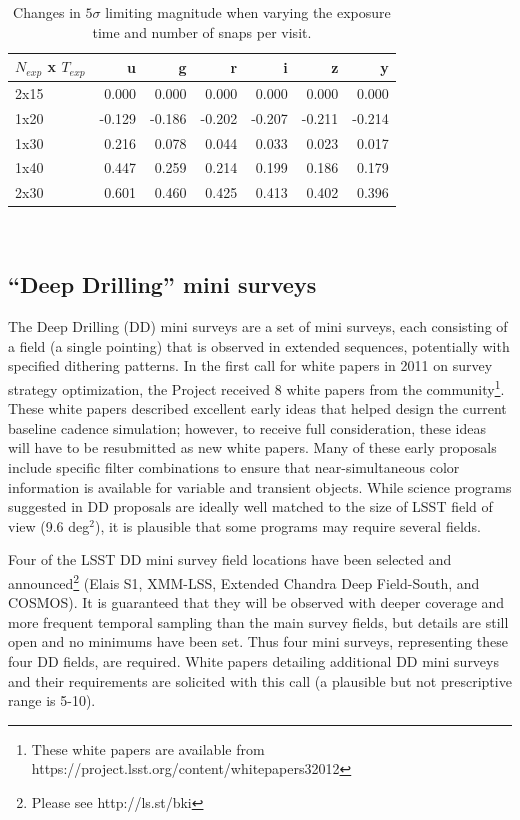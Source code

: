 \documentclass[DM,toc,usenatbib]{lsstdoc}
\begin{document}
\begin{table}[htbp]
\centering
\caption{Changes in $5\sigma$ limiting magnitude when varying the exposure time and number of snaps per visit.}
\begin{tabular}{lrrrrrr}
\hline
{$N_{exp}$ x $T_{exp}$} &      u &      g &      r &      i &      z &      y \\
\hline
2x15 &  0.000 &  0.000 &  0.000 &  0.000 &  0.000 &  0.000 \\
1x20 & -0.129 & -0.186 & -0.202 & -0.207 & -0.211 & -0.214 \\
1x30 &  0.216 &  0.078 &  0.044 &  0.033 &  0.023 &  0.017 \\
1x40 &  0.447 &  0.259 &  0.214 &  0.199 &  0.186 &  0.179 \\
2x30 &  0.601 &  0.460 &  0.425 &  0.413 &  0.402 &  0.396 \\
\hline
\end{tabular}\\ \vskip 0.05in
\label{m5.tab}
\end{table}


\subsection{``Deep Drilling'' mini surveys} 

The Deep Drilling (DD) mini surveys are a set of mini surveys, each consisting of a field (a single pointing) 
that is observed in extended sequences, potentially with specified dithering patterns.
In the first call for white papers in 2011 on survey strategy optimization, the Project received 
8 white papers from the community\footnote{These white papers are available from 
https://project.lsst.org/content/whitepapers32012}. 
These white papers described excellent early ideas that helped design the current baseline 
cadence simulation; however, to receive full consideration, these ideas will have to be 
resubmitted as new white papers. Many of these early proposals include specific 
filter combinations to ensure that near-simultaneous color information is available for 
variable and transient objects. While science programs suggested in DD proposals are ideally well 
matched to the size of LSST field of view (9.6 deg$^2$), it is plausible that some
programs may require several fields. 

Four of the LSST DD mini survey field locations have been selected and announced\footnote{Please see http://ls.st/bki} (Elais S1, 
XMM-LSS, Extended Chandra Deep Field-South, and COSMOS). It is guaranteed that they 
will be observed with deeper coverage and more frequent temporal sampling than the main 
survey fields, but details are still open and no minimums have been set. Thus four mini surveys,
representing these four DD fields, are required. White papers detailing additional DD mini surveys and their
requirements are solicited with this call (a plausible but not prescriptive range is 5-10).
\end{document}

